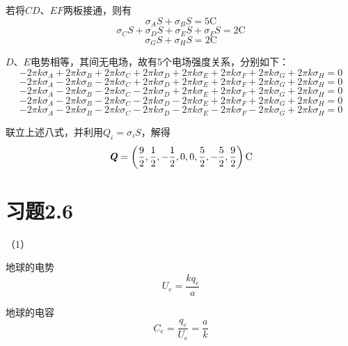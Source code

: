 \documentclass{SCIS2020cn}
\begin{document}
若将$CD$、$EF$两板接通，则有
\begin{equation}
    \sigma_AS+\sigma_BS=5\text{C}
\end{equation}
\begin{equation}
    \sigma_CS+\sigma_DS+\sigma_ES+\sigma_FS=2\text{C}
\end{equation}
\begin{equation}
    \sigma_GS+\sigma_HS=2\text{C}
\end{equation}

$D$、$E$电势相等，其间无电场，故有5个电场强度关系，分别如下：
\begin{equation}
    -2\pi{}k\sigma_A+2\pi{}k\sigma_B+2\pi{}k\sigma_C+2\pi{}k\sigma_D+2\pi{}k\sigma_E+2\pi{}k\sigma_F+2\pi{}k\sigma_G+2\pi{}k\sigma_H=0
\end{equation}
\begin{equation}
    -2\pi{}k\sigma_A-2\pi{}k\sigma_B-2\pi{}k\sigma_C+2\pi{}k\sigma_D+2\pi{}k\sigma_E+2\pi{}k\sigma_F+2\pi{}k\sigma_G+2\pi{}k\sigma_H=0
\end{equation}
\begin{equation}
    -2\pi{}k\sigma_A-2\pi{}k\sigma_B-2\pi{}k\sigma_C-2\pi{}k\sigma_D+2\pi{}k\sigma_E+2\pi{}k\sigma_F+2\pi{}k\sigma_G+2\pi{}k\sigma_H=0
\end{equation}
\begin{equation}
    -2\pi{}k\sigma_A-2\pi{}k\sigma_B-2\pi{}k\sigma_C-2\pi{}k\sigma_D-2\pi{}k\sigma_E+2\pi{}k\sigma_F+2\pi{}k\sigma_G+2\pi{}k\sigma_H=0
\end{equation}
\begin{equation}
    -2\pi{}k\sigma_A-2\pi{}k\sigma_B-2\pi{}k\sigma_C-2\pi{}k\sigma_D-2\pi{}k\sigma_E-2\pi{}k\sigma_F-2\pi{}k\sigma_G+2\pi{}k\sigma_H=0
\end{equation}

联立上述八式，并利用$Q_i=\sigma_iS$，解得
\begin{equation}
\textbf{\emph{Q}}=\left(\frac{9}{2},\frac{1}{2},-\frac{1}{2},0,0,\frac{5}{2},-\frac{5}{2},\frac{9}{2}\right)\text{C}
\end{equation}
\section{习题2.6}
（1）

地球的电势
\begin{equation}
    U_e=\frac{kq_e}{a}
\end{equation}

地球的电容
\begin{equation}
    C_e=\frac{q_e}{U_e}=\frac{a}{k}
\end{equation}
\end{document}
